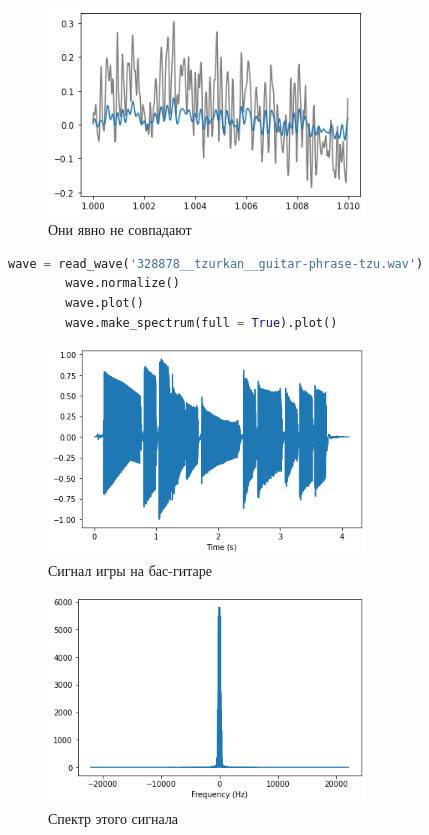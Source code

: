 \documentclass[a4paper, 12pt]{report}
\begin{document}
	\begin{figure}[H]
		\centering
		\includegraphics[width=0.75\textwidth]{samp7.png}
		\caption{Они явно не совпадают}
		\label{fig:samp7}
	\end{figure}
	\begin{lstlisting}[language=Python,caption=Возьмем другой сигнал]
		wave = read_wave('328878__tzurkan__guitar-phrase-tzu.wav')
		wave.normalize()
		wave.plot()
		wave.make_spectrum(full = True).plot()
	\end{lstlisting}
	\begin{figure}[H]
		\centering
		\includegraphics[width=0.75\textwidth]{samp8.png}
		\caption{Сигнал игры на бас-гитаре}
		\label{fig:samp8}
	\end{figure}
	\begin{figure}[H]
		\centering
		\includegraphics[width=0.75\textwidth]{samp9.png}
		\caption{Спектр этого сигнала}
		\label{fig:samp9}
	\end{figure}
\end{document}
